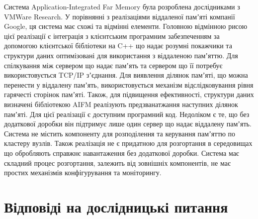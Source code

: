 \documentclass[14pt]{article}
\begin{document}
Система Application-Integrated Far Memory була розроблена дослідниками з VMWare Research. У порівнянні з реалізаціями віддаленої памʼяті компанії Google, ця система має схожі та відмінні елементи.
	Головною відмінною рисою цієї реалізації є інтеграція з клієнтським програмним забезпеченням за допомогою клієнтської бібліотеки на C++ що надає розумні покажчики та структури даних оптимізовані для використання з віддаленою памʼяттю.
	Для спілкування між сервером що надає памʼять та сервером що її потребує використовується TCP/IP зʼєднання.
	Для виявлення ділянок памʼяті, що можна перенести у віддалену памʼять, використовується механізм відслідковування рівня гарячесті сторінок памʼяті. Також, для підвищення ефективності, структури даних визначені бібліотекою AIFM реалізують предзванатжання наступних ділянок памʼяті.
	Для цієї реалізації є доступним програмний код. Недоліком є те, що без додаткової доробки він підтримує лише один сервер що надає віддалену памʼять. Система не містить компоненту для розподілення та керування памʼяттю по кластеру вузлів. Також реалізація не є придатною для розгортання в середовищах що обробляють справжнє навантаження без додаткової доробки. Система має складний процес розгортання, залежить від зовнішніх компонентів, не має простих механізмів конфігурування та моніторингу.

\section{Відповіді на дослідницькі питання}
\end{document}
